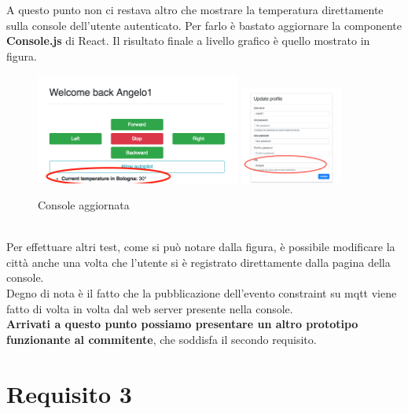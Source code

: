 \documentclass{llncs}
\begin{document}
A questo punto non ci restava altro che mostrare la temperatura direttamente sulla console dell'utente autenticato. Per farlo \`e bastato aggiornare la componente \textbf{Console.js} di React. Il risultato finale a livello grafico \`e quello mostrato in figura.\\
\begin{figure}
    \centering
    \includegraphics[width=0.6\textwidth]{Immagini/Requisito2/ConsoleReq2(1).png}
    \includegraphics[width=0.3\textwidth]{Immagini/Requisito2/ConsoleReq2(2).png}
    \caption{Console aggiornata}
    \label{fig:ConsoleUpdateReq2}
\end{figure}
\vspace*{1ex}
\\
Per effettuare altri test, come si pu\`o notare dalla figura, \`e possibile modificare la citt\`a anche una volta che l'utente si \`e registrato direttamente dalla pagina della console.\\
Degno di nota \`e il fatto che la pubblicazione dell'evento constraint su mqtt viene fatto di volta in volta dal web server presente nella console.\\
\textbf{Arrivati a questo punto possiamo presentare un altro prototipo funzionante al commitente}, che soddisfa il secondo requisito.
\pagebreak

\section{Requisito 3}
\label{Requisito3}
\end{document}
